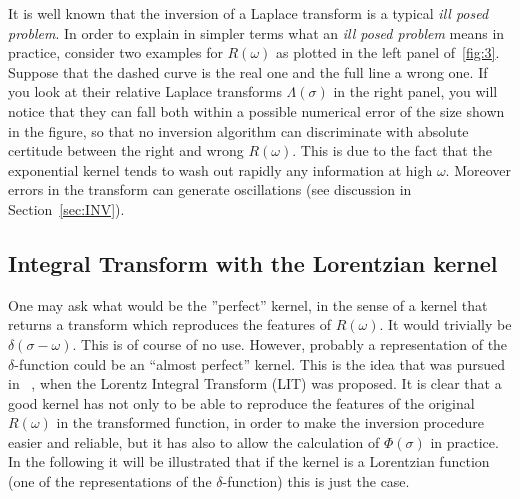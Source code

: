 It is well known that the inversion of a Laplace transform is a typical {\it ill posed problem}. In order to explain in simpler terms 
what an {\it ill posed problem}  means in practice, consider two examples for $R(\omega)$ as plotted in the left panel of~\ref{fig:3}. 
Suppose that the dashed curve
is the real one and the full line a wrong one. If you look at their relative Laplace transforms $\Lambda(\sigma)$ in the right panel, 
you will notice
that they can fall both within a possible numerical error of the size shown in the figure, so that no inversion algorithm 
can discriminate with absolute certitude between the right and wrong $R(\omega)$.
This is due to the fact that the exponential kernel tends to wash out rapidly any information at high $\omega$.
Moreover errors in the transform can generate oscillations (see discussion in Section~\ref{sec:INV}). 

\subsection{Integral Transform with the Lorentzian kernel}\label{sec:LIT}

One may ask what would be the ''perfect'' kernel, in the sense of a kernel that returns a transform which reproduces the features of
$R(\omega)$. It would trivially be $\delta(\sigma-\omega)$. This is of course of no use. However, probably a representation 
of the $\delta$-function could be an ``almost perfect'' kernel. This is the idea that was pursued in~ \cite{ELO94}, 
when the Lorentz Integral Transform (LIT) was proposed. It is clear that a good kernel has not only to be able to reproduce 
 the features of the original $R(\omega)$ in the transformed function, in order to make the inversion procedure easier and reliable, 
but it has also to allow the calculation
of $\Phi(\sigma)$ in practice. In the following it will be illustrated that if the kernel is a Lorentzian 
function (one of the representations of the $\delta$-function) this is just the case.

